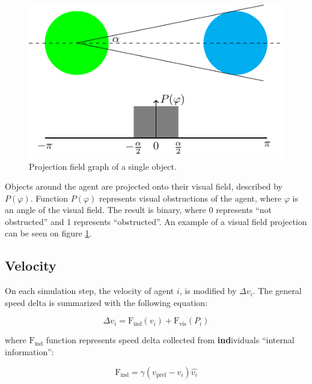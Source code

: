 \documentclass[9pt]{pnas-new}
\begin{document}
\begin{figure}
    \centering
    \includegraphics[width=0.9\linewidth]{projection.pdf}
    \caption{
       Projection field graph of a single object.
    }
    \label{fig:example-projection}
\end{figure}

\sloppy

Objects around the agent are projected onto their visual field, described by $P(\varphi)$.
Function $P(\varphi)$ represents visual obstructions of the agent, where $\varphi$ is an angle of the visual field. The result is binary, where 0 represents ``not obstructed'' and 1 represents ``obstructed''.
An example of a visual field projection can be seen on figure \ref{fig:example-projection}.

\fussy




\subsection{Velocity}

On each simulation step, the velocity of agent $i$, is modified by $\Delta v_i$.
The general speed delta is summarized with the following equation:

\begin{equation}
    \Delta v_i = \text{F}_{\text{ind}}(v_i) + \text{F}_{\text{vis}}(P_i)
\end{equation}

where $\text{F}_{\text{ind}}$ function represents speed delta collected from \textbf{ind}ividuals ``internal information'':

\begin{equation}
    \text{F}_{\text{ind}} = \gamma(v_\text{pref} - v_i)\hat{v_i}
\end{equation}
\end{document}
